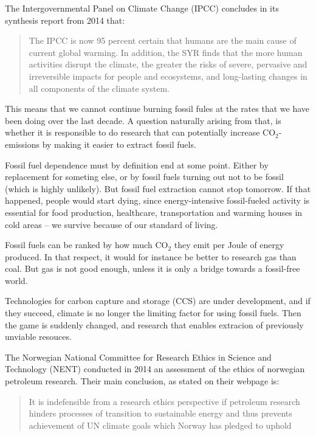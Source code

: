The Intergovernmental Panel on Climate Change (IPCC) concludes in its synthesis report from 2014 \cite{IPCC2014} that:

\begin{quotation}
The IPCC is now 95 percent certain that humans are the main cause of current global warming. In addition, the SYR finds that the more human activities disrupt the climate, the greater the risks of severe, pervasive and irreversible impacts for people and ecosystems, and long-lasting changes in all components of the climate system. 
\end{quotation}

This means that we cannot continue burning fossil fules at the rates that we have been doing over the last decade. A question naturally arising from that, is whether it is responsible to do research that can potentially increase CO$_2$-emissions by making it easier to extract fossil fuels.

Fossil fuel dependence must by definition end at some point. Either by replacement for someting else, or by fossil fuels turning out not to be fossil (which is highly unlikely). But fossil fuel extraction cannot stop tomorrow. If that happened, people would start dying, since energy-intensive fossil-fueled activity is essential for food production, healthcare, transportation and warming houses in cold areas -- we survive because of our standard of living.

Fossil fuels can be ranked by how much CO$_2$ they emit per Joule of energy produced. In that respect, it would for instance be better to research gas than coal. But gas is not good enough, unless it is only a bridge towards a fossil-free world.

Technologies for carbon capture and storage (CCS) are under development, and if they succeed, climate is no longer the limiting factor for using fossil fuels. Then the game is suddenly changed, and research that enables extracion of previously unviable resouces.

The Norwegian National Committee for Research Ethics in Science and Technology (NENT) conducted in 2014 an assessment of the ethics of norwegian petroleum research. Their main conclusion, as stated on their webpage is:

\begin{quotation}
It is indefensible from a research ethics perspective if petroleum research hinders processes of transition to sustainable energy and thus prevents achievement of UN climate goals which Norway has pledged to uphold
\end{quotation}

